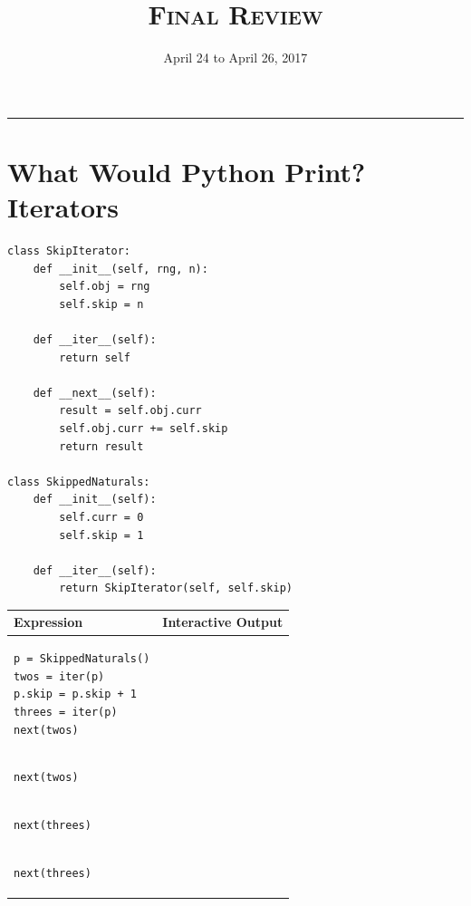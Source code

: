 \documentclass{exam}
\title{\textsc{Final Review}}
\date{April 24 to April 26, 2017}
\begin{document}
\maketitle
\rule{\textwidth}{0.15em}
\fontsize{12}{15}\selectfont


\section{What Would Python Print? Iterators}
\begin{questions}

\begin{blocksection}
\question
\begin{lstlisting}
class SkipIterator:
    def __init__(self, rng, n):
        self.obj = rng
        self.skip = n

    def __iter__(self):
        return self

    def __next__(self):
        result = self.obj.curr
        self.obj.curr += self.skip
        return result

class SkippedNaturals:
    def __init__(self):
        self.curr = 0
        self.skip = 1

    def __iter__(self):
        return SkipIterator(self, self.skip)
\end{lstlisting}
\end{blocksection}

\begin{blocksection}
\begin{tabular}{|l|l|}
\hline
\textbf{Expression} & \textbf{Interactive Output}\\\hline
\begin{lstlisting}
p = SkippedNaturals()
twos = iter(p)
p.skip = p.skip + 1
threes = iter(p)
next(twos)
\end{lstlisting}
& \\\hline
\begin{lstlisting}
next(twos)
\end{lstlisting}
& \\\hline
\begin{lstlisting}
next(threes)
\end{lstlisting}
& \\\hline
\begin{lstlisting}
next(threes)
\end{lstlisting}
& \\\hline
\end{tabular}


\end{blocksection}
\end{questions}
\end{document}
